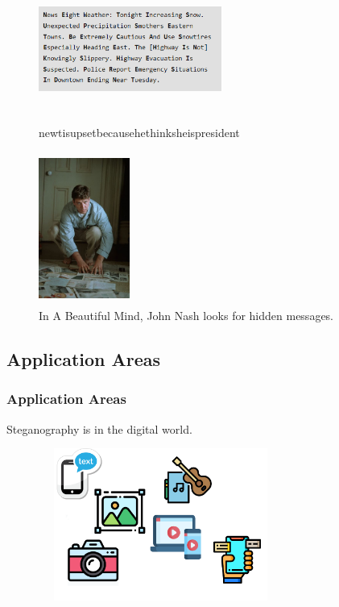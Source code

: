 \documentclass[12pt,hyperref={unicode}]{beamer}
\begin{document}
\begin{frame}
\begin{figure}
\begin{overprint}
        \centering\includegraphics[width=6cm, height=4cm]{null}\caption{newtisupsetbecausehethinksheispresident}
        \centering\includegraphics[width=3cm, height=5cm]{unnamed.jpg}\caption{In A Beautiful Mind, John Nash looks for hidden messages.}
    \end{overprint}
\end{figure}
\end{frame}

\subsection{Application Areas}
\begin{frame}
\frametitle{Application Areas}
Steganography is in the digital world. \\
\begin{figure}[h]
\centering
\includegraphics[width=8cm, height=5cm]{digital.png}
\end{figure}
\end{frame}
\end{document}
